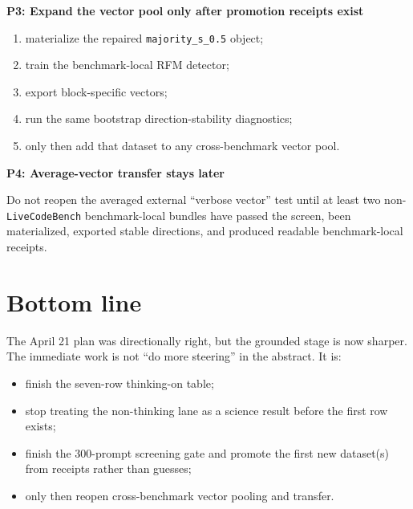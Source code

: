 \documentclass[11pt]{article}
\begin{document}
\textbf{P3: Expand the vector pool only after promotion receipts exist}
\begin{enumerate}
\item materialize the repaired \texttt{majority\_s\_0.5} object;
\item train the benchmark-local RFM detector;
\item export block-specific vectors;
\item run the same bootstrap direction-stability diagnostics;
\item only then add that dataset to any cross-benchmark vector pool.
\end{enumerate}

\textbf{P4: Average-vector transfer stays later}

Do not reopen the averaged external ``verbose vector'' test until at least two non-\texttt{LiveCodeBench} benchmark-local bundles have passed the screen, been materialized, exported stable directions, and produced readable benchmark-local receipts.

\section*{Bottom line}
The April 21 plan was directionally right, but the grounded stage is now sharper. The immediate work is not ``do more steering'' in the abstract. It is:
\begin{itemize}
\item finish the seven-row thinking-on table;
\item stop treating the non-thinking lane as a science result before the first row exists;
\item finish the 300-prompt screening gate and promote the first new dataset(s) from receipts rather than guesses;
\item only then reopen cross-benchmark vector pooling and transfer.
\end{itemize}
\end{document}
